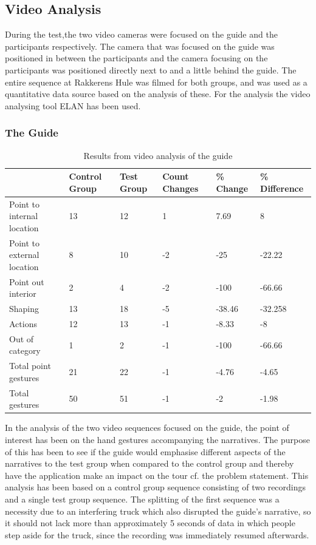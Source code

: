 \subsection{Video Analysis}
During the test,the two video cameras were focused on the guide and the participants respectively. The camera that was focused on the guide was positioned in between the participants and the camera focusing on the participants was positioned directly next to and a little behind the guide. The entire sequence at Rakkerens Hule was filmed for both groups, and was used as a quantitative data source based on the analysis of these. For the analysis the video analysing tool ELAN has been used. 

\subsubsection{The Guide}
\begin{table}
\begin{tabular}{| p{3cm} | p{1.6cm} | p{1.4cm} | p{1.6cm} | p{1.8cm} | p{2.2cm} |}\hline
  & Control Group & Test Group & Count Changes & \% Change & \% Difference \\ \hline
Point to internal location & 13 & 12 & 1 & 7.69 & 8 \\ \hline
Point to external location & 8 & 10 & -2 & -25 & -22.22 \\ \hline
Point out interior & 2 & 4 & -2 & -100 & -66.66 \\ \hline
Shaping & 13 & 18 & -5 & -38.46 & -32.258 \\ \hline
Actions & 12 & 13 & -1 & -8.33 & -8 \\ \hline
Out of category & 1 & 2 & -1 & -100 & -66.66 \\ \hline
Total point gestures & 21 & 22 & -1 & -4.76 & -4.65 \\ \hline
Total gestures & 50 & 51 & -1 & -2 & -1.98 \\ \hline
\end{tabular}
\caption{Results from video analysis of the guide \label{table:guide}}
\end{table}

In the analysis of the two video sequences focused on the guide, the point of interest has been on the hand gestures accompanying the narratives. The purpose of this has been to see if the guide would emphasise different aspects of the narratives to the test group when compared to the control group and thereby have the application make an impact on the tour cf. the problem statement. This analysis has been based on a control group sequence consisting of two recordings and a single test group sequence. The splitting of the first sequence was a necessity due to an interfering truck which also disrupted the guide’s narrative, so it should not lack more than approximately 5 seconds of data in which people step aside for the truck, since the recording was immediately resumed afterwards.

